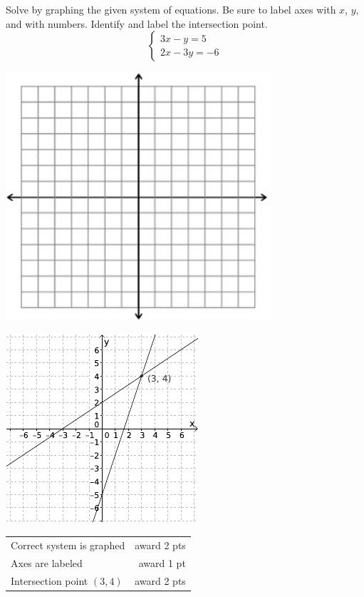 
{
	Solve by graphing the given system of equations. Be sure to label axes with $x$, $y$, and with numbers. Identify and label the intersection point. $$\begin{cases}3x-y=5\\ 2x-3y=-6\end{cases}$$ \begin{onlyproblem}\begin{center}\includegraphics{fig-graphpaper.png}\end{center}\end{onlyproblem} \begin{onlysolution}\begin{center}\includegraphics{fig095-10-d-answer}\end{center}\end{onlysolution}
	
}
{
	\begin{tabular}{l r}
	Correct system is graphed & award 2 pts\\
	Axes are labeled & award 1 pt\\
	Intersection point $(3,4)$ & award 2 pts
	\end{tabular}
}
